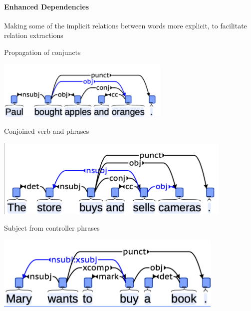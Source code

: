 \documentclass[10pt]{report}
\begin{document}
\paragraph{Enhanced Dependencies} Making some of the implicit relations between words more explicit, to facilitate relation extractions
\begin{list}{}{}
	\item Propagation of conjuncts
	\begin{center}
		\includegraphics[scale=0.5]{54.png}
	\end{center}
	\item Conjoined verb and phrases
	\begin{center}
		\includegraphics[scale=0.5]{55.png}
	\end{center}
	\item Subject from controller phrases
	\begin{center}
		\includegraphics[scale=0.5]{56.png}
	\end{center}
\end{list}
\end{document}

